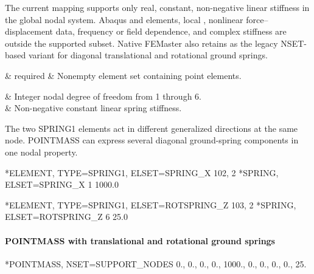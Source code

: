 The current mapping supports only real, constant, non-negative linear stiffness in the global nodal system. Abaqus  and  elements, local , nonlinear force--displacement data, frequency or field dependence, and complex stiffness are outside the supported subset. Native FEMaster also retains  as the legacy NSET-based variant for diagonal translational and rotational ground springs.

\begin{keywordparameters}
 & required & Nonempty element set containing  point elements. \\
\end{keywordparameters}

\begin{keyworddata}
 & Integer nodal degree of freedom from 1 through 6. \\
 & Non-negative constant linear spring stiffness. \\
\end{keyworddata}

The two SPRING1 elements act in different generalized directions at the same node. POINTMASS can express several diagonal ground-spring components in one nodal property.

\exampleheading
\begin{inputdeck}
*ELEMENT, TYPE=SPRING1, ELSET=SPRING_X
102, 2
*SPRING, ELSET=SPRING_X
1
1000.0

*ELEMENT, TYPE=SPRING1, ELSET=ROTSPRING_Z
103, 2
*SPRING, ELSET=ROTSPRING_Z
6
25.0
\end{inputdeck}

\paragraph*{POINTMASS with translational and rotational ground springs}
\begin{inputdeck}
*POINTMASS, NSET=SUPPORT_NODES
0.,
0., 0., 0.,
1000., 0., 0.,
0., 0., 25.
\end{inputdeck}
